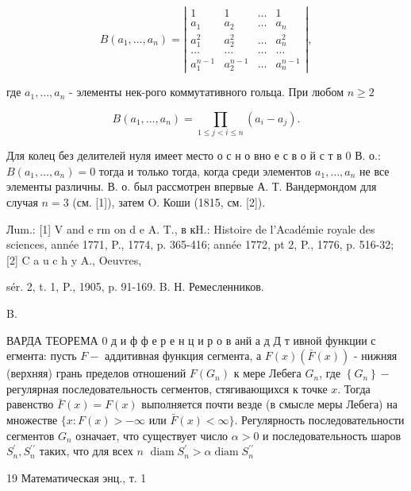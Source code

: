 \documentclass[10pt]{article}
\begin{document}
\[

B\left(a_{1}, \ldots, a_{n}\right)=\left|\begin{array}{cccc}

1 & 1 & \ldots & 1 \\

a_{1} & a_{2} & \ldots & a_{n} \\

a_{1}^{2} & a_{2}^{2} & \ldots & a_{n}^{2} \\

\ldots & \ldots & \ldots & \ldots \\

a_{1}^{n-1} & a_{2}^{n-1} & \ldots & a_{n}^{n-1}

\end{array}\right|,

\]



где $a_{1}, \ldots, a_{n}$ - элементы нек-рого коммутативного гольца. При любом $n \geqslant 2$



\[

B\left(a_{1}, \ldots, a_{n}\right)=\prod_{1 \leqslant j<i \leqslant n}\left(a_{i}-a_{j}\right) .

\]



Для колец без делителей нуля имеет место о с н о вно е с в о й с т в 0 В. о.: $B\left(a_{1}, \ldots, a_{n}\right)=0$ тогда и только тогда, когда среди элементов $a_{1}, \ldots, a_{n}$ не все элементы различны. В. о. был рассмотрен впервые А. Т. Вандермондом для случая $n=3$ (см. [1]), затем O. Коши (1815, см. [2]).



Лum.: [1] V and e rm on d e A. T., в кH.: Histoire de l'Académie royale des sciences, année 1771, P., 1774, p. 365-416; année 1772, pt 2, P., 1776, p. 516-32; [2] C a u c h y A., Oeuvres,

sér. 2, t. 1, P., 1905, p. 91-169. B. Н. Ремесленников.

B.



ВАРДА ТЕОРЕМА 0 д и ф ф е р е н ц и р о в анй а д Д т ивной функции с егмента: пусть $F-$ аддитивная функция сегмента, а $F(x)(\bar{F}(x))$ - нижняя (верхняя) грань пределов отношений $F\left(G_{n}\right)$ к мере Лебега $G_{n}$, где $\left\{G_{n}\right\}-$ регулярная последовательность сегментов, стягивающихся к точке $x$. Тогда равенство $\bar{F}(x)=F(x)$ выполняется почти везде (в смысле меры Лебега) на множестве $\{x: F(x)>-\infty$ или $\bar{F}(x)<\infty\}$. Регулярность последовательности сегментов $G_{n}$ означает, что существует число $\alpha>0$ и последовательность шаров $S_{n}^{\prime}, S_{n}^{\prime \prime}$ таких, что для всех $n$ $\operatorname{diam} S_{n}^{\prime}>\alpha \operatorname{diam} S_{n}^{\prime \prime}$



19 Математическая энц., т. 1
\end{document}
